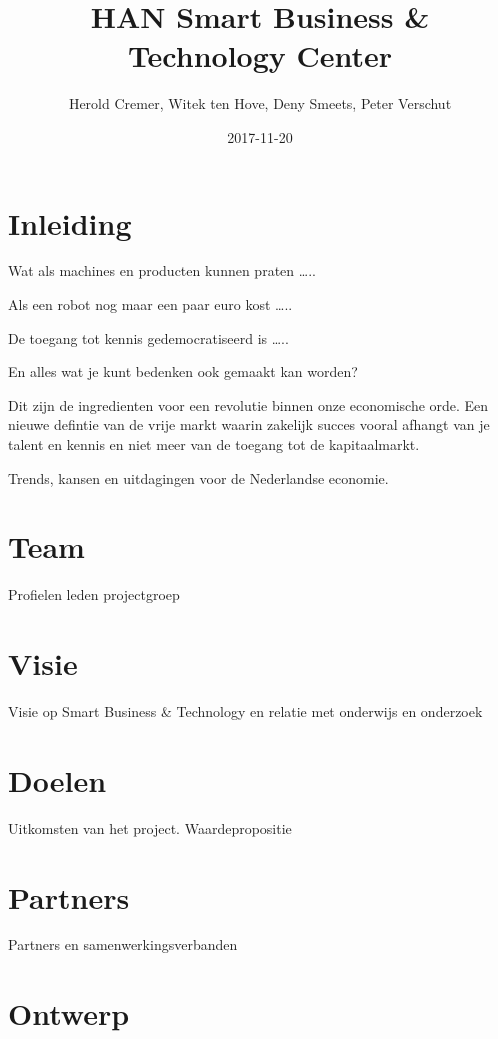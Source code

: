 \documentclass[]{book}
\title{HAN Smart Business \& Technology Center}
\author{Herold Cremer, Witek ten Hove, Deny Smeets, Peter Verschut}
\date{2017-11-20}
\begin{document}
\maketitle

{
\setcounter{tocdepth}{1}
\tableofcontents
}
\chapter{Inleiding}\label{inleiding}

Wat als machines en producten kunnen praten \ldots{}..

Als een robot nog maar een paar euro kost \ldots{}..

De toegang tot kennis gedemocratiseerd is \ldots{}..

En alles wat je kunt bedenken ook gemaakt kan worden?

Dit zijn de ingredienten voor een revolutie binnen onze economische
orde. Een nieuwe defintie van de vrije markt waarin zakelijk succes
vooral afhangt van je talent en kennis en niet meer van de toegang tot
de kapitaalmarkt.

Trends, kansen en uitdagingen voor de Nederlandse economie.

\chapter{Team}\label{team}

Profielen leden projectgroep

\chapter{Visie}\label{visie}

Visie op Smart Business \& Technology en relatie met onderwijs en
onderzoek

\chapter{Doelen}\label{doelen}

Uitkomsten van het project. Waardepropositie

\chapter{Partners}\label{partners}

Partners en samenwerkingsverbanden

\chapter{Ontwerp}\label{ontwerp}
\end{document}

